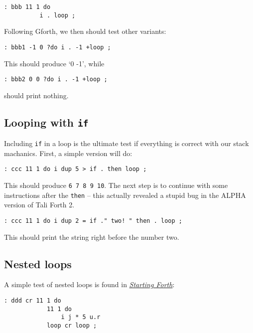 \begin{lstlisting}[frame=lines]
        : bbb 11 1 do 
          i . loop ; 
\end{lstlisting}

\noindent Following Gforth, we then should test other variants:

\begin{lstlisting}[frame=lines]
        : bbb1 -1 0 ?do i . -1 +loop ;
\end{lstlisting}

\noindent This should produce `0 -1', while

\begin{lstlisting}[frame=lines]
        : bbb2 0 0 ?do i . -1 +loop ;
\end{lstlisting}

\noindent should print nothing.

\subsection{Looping with \texttt{if}}

Including \texttt{if} in a loop is the ultimate test if everything is correct
with our stack machanics. First, a simple version will do:

\begin{lstlisting}[frame=lines]
        : ccc 11 1 do i dup 5 > if . then loop ; 
\end{lstlisting}

\noindent This should produce \texttt{6 7 8 9 10}. The next step is to continue
with some instructions after the \texttt{then} -- this actually revealed a
stupid bug in the ALPHA version of Tali Forth 2.

\begin{lstlisting}[frame=lines]
        : ccc 11 1 do i dup 2 = if ." two! " then . loop ;
\end{lstlisting}

\noindent This should print the string right before the number two.

\subsection{Nested loops}

\noindent A simple test of nested loops is found in
\href{https://www.forth.com/starting-forth/6-forth-do-loops/}{\textit{Starting
Forth}}:

\begin{lstlisting}[frame=lines]
        : ddd cr 11 1 do
            11 1 do 
                i j * 5 u.r 
            loop cr loop ;
\end{lstlisting}


